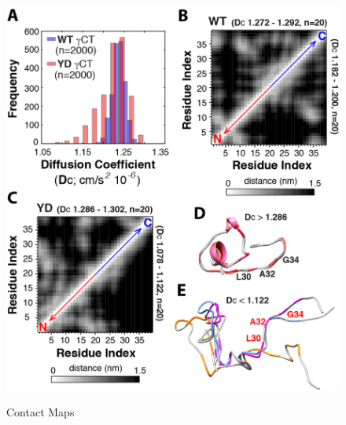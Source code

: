 \begin{figure}
\includegraphics{figures/Figure_8_Dc_version.png}
\label{contacts}
\caption{Contact Maps}
\end{figure}

